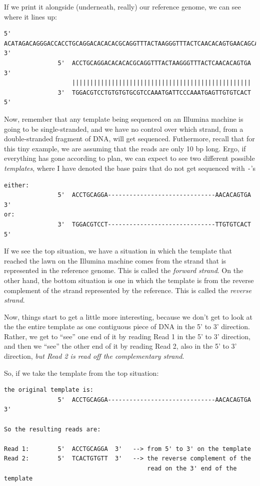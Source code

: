 \documentclass[]{krantz}
\begin{document}
If we print it alongside (underneath, really) our reference genome,
we can see where it lines up:

\begin{verbatim}
5'  ACATAGACAGGGACCACCTGCAGGACACACACGCAGGTTTACTAAGGGTTTACTCAACACAGTGAACAGCATATACCAGA  3'
               5'  ACCTGCAGGACACACACGCAGGTTTACTAAGGGTTTACTCAACACAGTGA  3'
                   ||||||||||||||||||||||||||||||||||||||||||||||||||
               3'  TGGACGTCCTGTGTGTGCGTCCAAATGATTCCCAAATGAGTTGTGTCACT  5'
\end{verbatim}

Now, remember that any template being sequenced on an Illumina machine is
going to be single-stranded, and we have no control over which strand, from
a double-stranded fragment of DNA, will get sequenced. Futhermore, recall that
for this tiny example, we are assuming that the reads are only 10 bp long.
Ergo, if everything has gone according to plan, we can expect to see two
different possible \emph{templates}, where I have denoted the base pairs
that do not get sequenced with \texttt{-}'s

\begin{verbatim}
either:
               5'  ACCTGCAGGA------------------------------AACACAGTGA  3'
or:
               3'  TGGACGTCCT------------------------------TTGTGTCACT  5'
\end{verbatim}

If we see the top situation, we have a situation in which the template that reached
the lawn on the Illumina machine comes from the strand that is represented
in the reference genome. This is called the \emph{forward strand}. On the other hand,
the bottom situation is one in which the template is from the reverse complement
of the strand represented by the reference. This is called the \emph{reverse strand}.

Now, things start to get a little more interesting, because we don't get to look at the
the entire template as one contiguous piece of DNA in the 5' to 3' direction.
Rather, we get to ``see'' one end of it by reading Read 1 in the 5' to 3' direction,
and then we ``see'' the other end of it by reading Read 2, also in the 5' to 3' direction,
\emph{but Read 2 is read off the complementary strand}.

So, if we take the template from the top situation:

\begin{verbatim}
the original template is:
               5'  ACCTGCAGGA------------------------------AACACAGTGA  3'
               
So the resulting reads are:

Read 1:        5'  ACCTGCAGGA  3'   --> from 5' to 3' on the template
Read 2:        5'  TCACTGTGTT  3'   --> the reverse complement of the
                                        read on the 3' end of the template
\end{verbatim}
\end{document}
